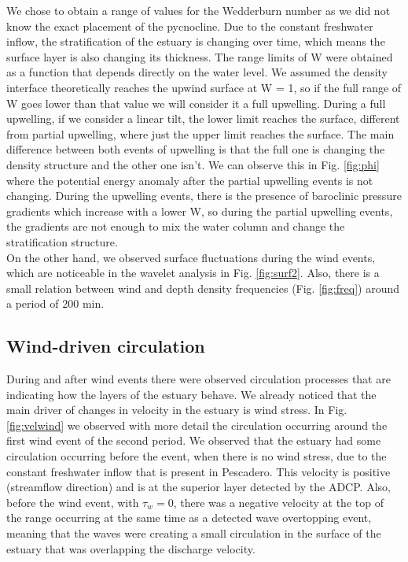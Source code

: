 \documentclass[tesis.tex]{subfiles}
\begin{document}
We chose to obtain a range of values for the Wedderburn number as we did not know the exact placement of the pycnocline. Due to the constant freshwater inflow, the stratification of the estuary is changing over time, which means the surface layer is also changing its thickness. The range limits of W were obtained as a function that depends directly on the water level. We assumed the density interface theoretically reaches the upwind surface at W = 1, so if the full range of W goes lower than that value we will consider it a full upwelling. During a full upwelling, if we consider a linear tilt, the lower limit reaches the surface, different from partial upwelling, where just the upper limit reaches the surface. The main difference between both events of upwelling is that the full one is changing the density structure and the other one isn't. We can observe this in Fig. \ref{fig:phi} where the potential energy anomaly after the partial upwelling events is not changing. During the upwelling events, there is the presence of baroclinic pressure gradients which increase with a lower W, so during the partial upwelling events, the gradients are not enough to mix the water column and change the stratification structure.\\

On the other hand, we observed surface fluctuations during the wind events, which are noticeable in the wavelet analysis in Fig. \ref{fig:surf2}. Also, there is a small relation between wind and depth density frequencies (Fig. \ref{fig:freq}) around a period of 200 min.\\

\subsection{Wind-driven circulation}

During and after wind events there were observed circulation processes that are indicating how the layers of the estuary behave. We already noticed that the main driver of changes in velocity in the estuary is wind stress. In Fig. \ref{fig:velwind} we observed with more detail the circulation occurring around the first wind event of the second period. We observed that the estuary had some circulation occurring before the event, when there is no wind stress, due to the constant freshwater inflow that is present in Pescadero. This velocity is positive (streamflow direction) and is at the superior layer detected by the ADCP. Also, before the wind event, with $\tau_w =0$, there was a negative velocity at the top of the range occurring at the same time as a detected wave overtopping event, meaning that the waves were creating a small circulation in the surface of the estuary that was overlapping the discharge velocity.\\
\end{document}
